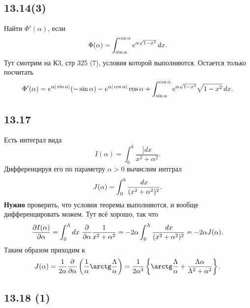 \subsection*{13.14(3)}

Найти $\Phi'(\alpha)$, если 
\begin{equation*}
    \Phi(\alpha) = \int_{\sin \alpha}^{\cos \alpha} e^{\alpha\sqrt{1-x^2}} \, d x.
\end{equation*}
Тут смотрим на К3, стр 325 (7), условия которой выполняются. Остается только посчитать
\begin{equation*}
    \Phi'(\alpha) = e^{\alpha |\sin \alpha|} (-\sin \alpha) - e^{\alpha |\cos \alpha|} \cos \alpha + \int_{\sin \alpha}^{\cos \alpha} e^{\alpha \sqrt{1-x^2}} \sqrt{1-x^2} \, d x.
\end{equation*}


\subsection*{13.17}

Есть интеграл вида
\begin{equation*}
    I(\alpha) = \int_0^b \frac{]d x}{x^2 + \alpha^2}.
\end{equation*}
Дифференцируя его по параметру $\alpha > 0$ вычислим интграл
\begin{equation*}
    J(\alpha) = \int_0^b \frac{\, d x}{(x^2 + \alpha^2)^2}.
\end{equation*}
\textbf{Нужно} проверить, что условия теоремы выполняются, и вообще дифференцировать можем.
Тут всё хорошо, так что
\begin{equation*}
    \frac{\partial I(\alpha)}{\partial \alpha} = \int_0^\Lambda dx \ \frac{\partial }{\partial \alpha} \frac{1}{x^2+\alpha^2} = - 2 \alpha \int_0^\Lambda \frac{\, d x}{(x^2 + \alpha^2)^2} = - 2 \alpha J(\alpha).
\end{equation*}
Таким образом приходим к
\begin{equation*}
    J(\alpha) = \frac{1}{2\alpha} \frac{\partial }{\partial \alpha} \left(
        \frac{1}{\alpha} \arctg \frac{\Lambda}{\alpha}
    \right) = \frac{1}{2\alpha^3} \left\{
        \arctg \frac{\Lambda}{\alpha} + \frac{\Lambda \alpha}{\Lambda^2 + \alpha^2}
    \right\}.
\end{equation*}


\subsection*{13.18 (1)}

